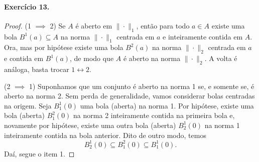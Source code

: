 \documentclass[12pt,a4paper]{article}
\begin{document}
\paragraph{Exercício 13.}
\begin{proof}
(1 $\implies$ 2) Se $A$ é aberto em $\|\cdot \|_1$, então para todo $a\in A$ existe uma bola $B^1(a)\subseteq A$ na norma 
$\|\cdot\|_1$ centrada em $a$ e inteiramente contida em $A$. Ora, mas por hipótese existe uma bola $B^2(a)$ 
na norma $\|\cdot\|_2$ centrada em $a$ e contida em $B^1(a)$, de modo que $A$ é aberto na norma $\|\cdot\|_2$. 
A volta é análoga, basta trocar $1 \leftrightarrow 2$.

(2 $\implies$ 1) Suponhamos que um conjunto é aberto na norma 1 se, e somente se, é aberto na norma 2. Sem perda de
generalidade, vamos considerar bolas centradas na origem. Seja $B_1^1(0)$ uma bola (aberta) na norma 1. Por hipótese,
existe uma bola (aberta) $B_1^2(0)$ na norma 2 inteiramente contida na primeira bola e, novamente por hipótese, existe
uma outra bola (aberta) $B_2^1(0)$ na norma 1 inteiramente contida na bola anterior. Dito de outro modo, temos
\begin{equation*}
    B_2^1(0) \subseteq B_1^2(0) \subseteq B_1^1(0).
\end{equation*}
Daí, segue o item 1.
\end{proof}
\end{document}
